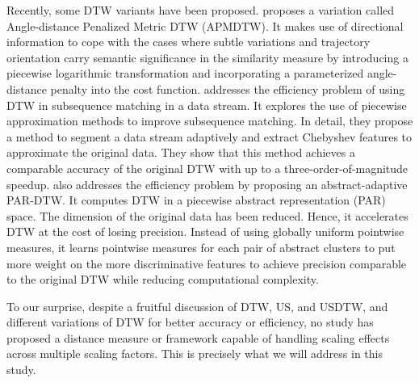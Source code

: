 Recently, some DTW variants have been proposed. 
\cite{zeng2025similarity} proposes a variation called Angle-distance Penalized Metric DTW (APMDTW). It makes use of directional information to cope with the cases where subtle variations and trajectory orientation carry semantic significance in the similarity measure by introducing a piecewise logarithmic transformation and incorporating a parameterized angle-distance penalty into the cost function.
\cite{cai2025piecewise} addresses the efficiency problem of using DTW in subsequence matching in a data stream. It explores the use of piecewise approximation methods to improve subsequence matching.
In detail, they propose a method to segment a data stream adaptively and extract Chebyshev features to approximate the original data.
They show that this method achieves a comparable accuracy of the original DTW with up to a three-order-of-magnitude speedup.
\cite{cai2025adapdtw} also addresses the efficiency problem by proposing an abstract-adaptive PAR-DTW. It computes DTW in a piecewise abstract representation (PAR) space. The dimension of the original data has been reduced.
Hence, it accelerates DTW at the cost of losing precision.
Instead of using globally uniform pointwise measures, it learns pointwise measures for each pair of abstract clusters to put more weight on the more discriminative features to achieve precision comparable to the original DTW while reducing computational complexity.

To our surprise, despite a fruitful discussion of DTW, US, and USDTW, and different variations of DTW for better accuracy or efficiency, no study has proposed a distance measure or framework capable of handling scaling effects across multiple scaling factors.
This is precisely what we will address in this study.